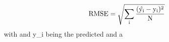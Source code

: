 $$\rm{RMSE}=\sqrt{\sum\limits_{i}\frac{(\hat{y_i}-y_i)^2}{N}}$$
with  and y_i being the predicted and a